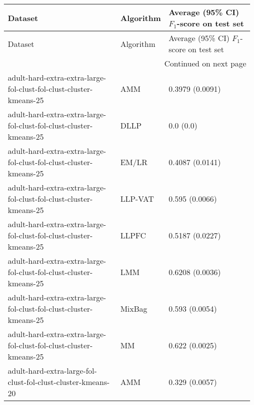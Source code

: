 \begin{longtable}{lll}
\toprule
                                                                                                      Dataset & Algorithm & Average (95\% CI) $F_1$-score on test set \\
\midrule
\endfirsthead

\toprule
                                                                                                      Dataset & Algorithm & Average (95\% CI) $F_1$-score on test set \\
\midrule
\endhead
\midrule
\multicolumn{3}{r}{{Continued on next page}} \\
\midrule
\endfoot

\bottomrule
\endlastfoot
                                           adult-hard-extra-extra-large-fol-clust-fol-clust-cluster-kmeans-25 &       AMM &                           0.3979 (0.0091) \\
                                           adult-hard-extra-extra-large-fol-clust-fol-clust-cluster-kmeans-25 &      DLLP &                                 0.0 (0.0) \\
                                           adult-hard-extra-extra-large-fol-clust-fol-clust-cluster-kmeans-25 &     EM/LR &                           0.4087 (0.0141) \\
                                           adult-hard-extra-extra-large-fol-clust-fol-clust-cluster-kmeans-25 &   LLP-VAT &                            0.595 (0.0066) \\
                                           adult-hard-extra-extra-large-fol-clust-fol-clust-cluster-kmeans-25 &     LLPFC &                           0.5187 (0.0227) \\
                                           adult-hard-extra-extra-large-fol-clust-fol-clust-cluster-kmeans-25 &       LMM &                           0.6208 (0.0036) \\
                                           adult-hard-extra-extra-large-fol-clust-fol-clust-cluster-kmeans-25 &    MixBag &                            0.593 (0.0054) \\
                                           adult-hard-extra-extra-large-fol-clust-fol-clust-cluster-kmeans-25 &        MM &                            0.622 (0.0025) \\
                                                 adult-hard-extra-large-fol-clust-fol-clust-cluster-kmeans-20 &       AMM &                            0.329 (0.0057) \\

\end{longtable}
